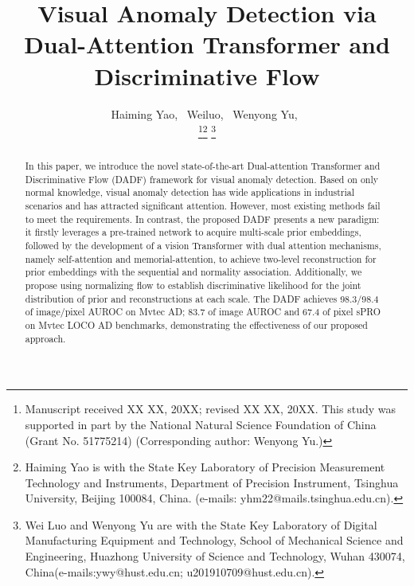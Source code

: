 \documentclass[journal]{IEEEtran}
\begin{document}
\title{Visual Anomaly Detection via Dual-Attention Transformer and Discriminative Flow}


\author{Haiming Yao,~
        Weiluo,~
        Wenyong Yu,~

\thanks{Manuscript received XX XX, 20XX; revised XX XX, 20XX. This study was supported in part by the National Natural Science Foundation of China (Grant No. 51775214) (Corresponding author: Wenyong Yu.)}\thanks{Haiming Yao is with the State Key Laboratory of Precision Measurement Technology and Instruments, Department of Precision Instrument, Tsinghua University, Beijing 100084, China. (e-mails: yhm22@mails.tsinghua.edu.cn).}
\thanks{Wei Luo and Wenyong Yu are with the State Key Laboratory of Digital Manufacturing Equipment and Technology, School of Mechanical Science and Engineering, Huazhong University of Science and Technology, Wuhan 430074, China(e-mails:ywy@hust.edu.cn; u201910709@hust.edu.cn).}}



\maketitle
\begin{abstract}
In this paper, we introduce the novel state-of-the-art Dual-attention Transformer and Discriminative Flow (DADF) framework for visual anomaly detection. Based on only normal knowledge, visual anomaly detection has wide applications in industrial scenarios and has attracted significant attention. However, most existing methods fail to meet the requirements. In contrast, the proposed DADF presents a new paradigm: it firstly leverages a pre-trained network to acquire multi-scale prior embeddings, followed by the development of a vision Transformer with dual attention mechanisms, namely self-attention and memorial-attention, to achieve two-level reconstruction for prior embeddings with the sequential and normality association. Additionally, we propose using normalizing flow to establish discriminative likelihood for the joint distribution of prior and reconstructions at each scale. The DADF achieves 98.3/98.4 of image/pixel AUROC on Mvtec AD; 83.7 of image AUROC and 67.4 of pixel sPRO on Mvtec LOCO AD benchmarks, demonstrating the effectiveness of our proposed approach.
\end{abstract}
\end{document}
